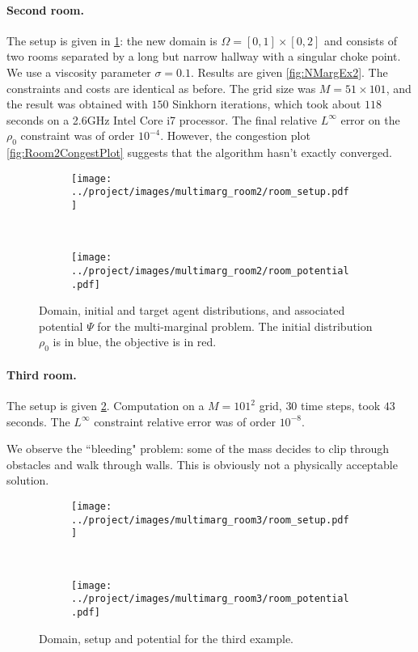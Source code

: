 \documentclass[../report.tex]{subfiles}
\begin{document}
\paragraph{Second room.} The setup is given in \cref{fig:NMarg2DomainPot}: the new domain is $\Omega = [0,1] \times [0,2]$ and consists of two rooms separated by a long but narrow hallway with a singular choke point. We use a viscosity parameter $\sigma = 0.1$. Results are given \cref{fig:NMargEx2}. The constraints and costs are identical as before. The grid size was $M = 51 \times 101$, and the result was obtained with $150$ Sinkhorn iterations, which took about $118$ seconds on a 2.6GHz Intel Core i7 processor. The final relative $L^\infty$ error on the $\rho_0$ constraint was of order $10^{-4}$. However, the congestion plot \cref{fig:Room2CongestPlot} suggests that the algorithm hasn't exactly converged.

\begin{figure}[h]
	\centering
	\begin{subfigure}[b]{.3\linewidth}
	\texttt{[image: ../project/images/multimarg\_room2/room\_setup.pdf]}
	\end{subfigure}~
	\begin{subfigure}[b]{.39\linewidth}
	\texttt{[image: ../project/images/multimarg\_room2/room\_potential.pdf]}
	\end{subfigure}
	\caption{Domain, initial and target agent distributions, and associated potential $\Psi$ for the multi-marginal problem. The initial distribution $\rho_0$ is in blue, the objective is in red.}\label{fig:NMarg2DomainPot}
\end{figure}



\paragraph{Third room.} The setup is given \cref{fig:Room3}. Computation on a $M=101^2$ grid, $30$ time steps, took $43$ seconds. The $L^\infty$ constraint relative error was of order $10^{-8}$.

We observe the ``bleeding" problem: some of the mass decides to clip through obstacles and walk through walls. This is obviously not a physically acceptable solution.

\begin{figure}[h]
	\centering
	\begin{subfigure}[c]{.3\linewidth}
	\texttt{[image: ../project/images/multimarg\_room3/room\_setup.pdf]}	
	\end{subfigure}~
	\begin{subfigure}[c]{.4\linewidth}
	\texttt{[image: ../project/images/multimarg\_room3/room\_potential.pdf]}	
	\end{subfigure}
	\caption{Domain, setup and potential for the third example.}\label{fig:Room3}
\end{figure}
\end{document}

